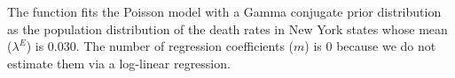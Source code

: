 \documentclass[article]{jss}
\begin{document}




The function  fits the Poisson model with a Gamma conjugate prior distribution as the population distribution of the death rates in New York states whose mean ($\lambda^E$) is 0.030. The number of regression coefficients ($m$) is 0 because we do not estimate them via  a log-linear regression. 
\end{document}
